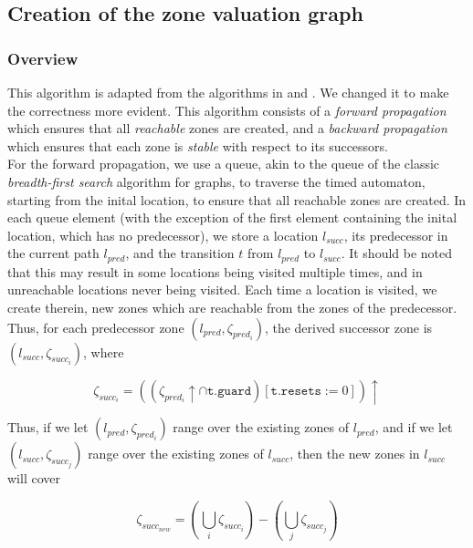 \documentclass[a4paper]{llncs}
\begin{document}
\subsection{Creation of the zone valuation graph}

\subsubsection{Overview}

This algorithm is adapted from the algorithms in
\cite{DBLP:conf/cav/GuhaNA12} and \cite{guha2013notes}. We changed it
to make the correctness more evident. 
This algorithm consists of a \emph{forward
  propagation} which ensures that all \emph{reachable} zones are created, and a
\emph{backward propagation} which ensures that each zone is \emph{stable} with
respect to its successors. \\

For the forward propagation, we use a queue,
akin to the queue of the classic \emph{breadth-first search} algorithm
for graphs, to traverse the timed automaton, starting from the inital
location, to ensure that all reachable zones are created. In each
queue element (with the exception of the first element containing the
inital location, which has no predecessor), we store a location
$l_{succ}$, its predecessor in the current path $l_{pred}$, and the
transition $t$ from $l_{pred}$ to $l_{succ}$. It should be noted
that this may result in some locations being visited multiple times,
and in unreachable locations never being visited. Each time a location
is visited, we create therein, new zones which are reachable from the
zones of the predecessor. \\
Thus, for each predecessor zone $(l_{pred}, \zeta _{pred_{i}})$, the
derived successor zone is $(l_{succ}, \zeta _{succ_{i}})$, where

\begin{displaymath} 
  \zeta _{succ_{i}} = ((\zeta _{pred_{i}} \uparrow \cap \texttt{t.guard})[\texttt{t.resets} := 0]) \uparrow
\end{displaymath} 

Thus, if we let  $(l_{pred}, \zeta _{pred_{i}})$ range over the
existing zones of $l_{pred}$, and if we let  $(l_{succ}, \zeta
_{succ_{j}})$ range over the existing zones of $l_{succ}$, then the
new zones in $l_{succ}$ will cover

\begin{displaymath} 
  \zeta _{succ_{new}} = (\bigcup _{i} \zeta_{succ_{i}}) - (\bigcup _{j} \zeta_{succ_{j}})
\end{displaymath} 
\end{document}
